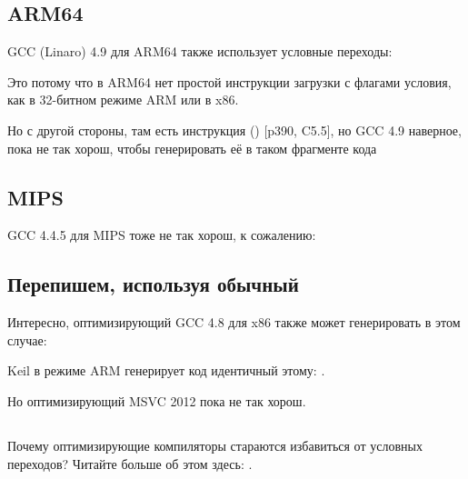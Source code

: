 

\subsection{ARM64}

\Optimizing GCC (Linaro) 4.9 для ARM64 также использует условные переходы:



Это потому что в ARM64 нет простой инструкции загрузки с флагами условия, как  в 32-битном 
режиме ARM или  в x86.

Но с другой стороны, там есть инструкция  ()
[\ARMSixFourRef p390, C5.5],
но GCC 4.9 наверное, пока не так
хорош, чтобы генерировать её в таком фрагменте кода

\subsection{MIPS}

GCC 4.4.5 для MIPS тоже не так хорош, к сожалению:



\subsection{Перепишем, используя обычный }



Интересно, оптимизирующий GCC 4.8 для x86 также может генерировать  в этом случае:



\Optimizing Keil в режиме ARM генерирует код идентичный этому: .

Но оптимизирующий MSVC 2012 пока не так хорош.

\subsection{\Conclusion{}}

Почему оптимизирующие компиляторы стараются избавиться от условных переходов? Читайте больше об этом здесь:
 .

